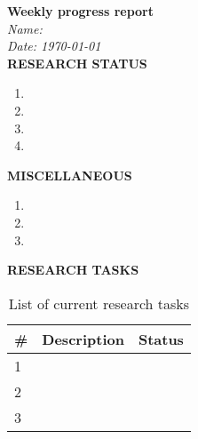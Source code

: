 \documentclass[12pt]{article}
\begin{document}
	
{\selectfont
\noindent\textbf{Weekly progress report}\\
\textit{Name: \\Date: \today}\\
\textbf{RESEARCH STATUS}
\begin{enumerate}
\item 
\item   
\item 
\item 
\end{enumerate}
\textbf{MISCELLANEOUS}
\begin{enumerate}
\item 
\item 
\item 
\end{enumerate}
\textbf{RESEARCH TASKS}
\begin{table}[h!]
{\selectfont
\centering
\begin{tabular}{ l | l | l } 
\textbf{\#} & \textbf{Description} &  \textbf{Status} \\
\hline\hline
1 & & \\
2 & & \\
3 & & \\
\end{tabular}
\caption{List of current research tasks}\label{variables}
}
\end{table}
}
\end{document}

